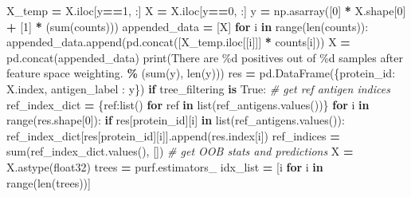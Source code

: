 \documentclass[
  11pt,
  oneside]{book}
\newenvironment{Shaded}{\begin{snugshade}}{\end{snugshade}}
\newcommand{\BuiltInTok}[1]{#1}
\newcommand{\CommentTok}[1]{\textcolor[rgb]{0.56,0.35,0.01}{\textit{#1}}}
\newcommand{\ControlFlowTok}[1]{\textcolor[rgb]{0.13,0.29,0.53}{\textbf{#1}}}
\newcommand{\DecValTok}[1]{\textcolor[rgb]{0.00,0.00,0.81}{#1}}
\newcommand{\KeywordTok}[1]{\textcolor[rgb]{0.13,0.29,0.53}{\textbf{#1}}}
\newcommand{\NormalTok}[1]{#1}
\newcommand{\OperatorTok}[1]{\textcolor[rgb]{0.81,0.36,0.00}{\textbf{#1}}}
\newcommand{\SpecialCharTok}[1]{\textcolor[rgb]{0.00,0.00,0.00}{#1}}
\newcommand{\StringTok}[1]{\textcolor[rgb]{0.31,0.60,0.02}{#1}}
\newcommand{\VariableTok}[1]{\textcolor[rgb]{0.00,0.00,0.00}{#1}}
\begin{document}
\begin{Shaded}
\begin{Highlighting}[]
\NormalTok{    X\_temp }\OperatorTok{=}\NormalTok{ X.iloc[y}\OperatorTok{==}\DecValTok{1}\NormalTok{, :]}
\NormalTok{    X }\OperatorTok{=}\NormalTok{ X.iloc[y}\OperatorTok{==}\DecValTok{0}\NormalTok{, :]}
\NormalTok{    y }\OperatorTok{=}\NormalTok{ np.asarray([}\DecValTok{0}\NormalTok{] }\OperatorTok{*}\NormalTok{ X.shape[}\DecValTok{0}\NormalTok{] }\OperatorTok{+}\NormalTok{ [}\DecValTok{1}\NormalTok{] }\OperatorTok{*}\NormalTok{ (}\BuiltInTok{sum}\NormalTok{(counts)))}
\NormalTok{    appended\_data }\OperatorTok{=}\NormalTok{ [X]}
    \ControlFlowTok{for}\NormalTok{ i }\KeywordTok{in} \BuiltInTok{range}\NormalTok{(}\BuiltInTok{len}\NormalTok{(counts)):}
\NormalTok{        appended\_data.append(pd.concat([X\_temp.iloc[[i]]] }\OperatorTok{*}\NormalTok{ counts[i]))}
\NormalTok{    X }\OperatorTok{=}\NormalTok{ pd.concat(appended\_data)}
    \BuiltInTok{print}\NormalTok{(}\StringTok{\textquotesingle{}There are }\SpecialCharTok{\%d}\StringTok{ positives out of }\SpecialCharTok{\%d}\StringTok{ samples after feature space weighting.\textquotesingle{}} \OperatorTok{\%}\NormalTok{ (}\BuiltInTok{sum}\NormalTok{(y), }\BuiltInTok{len}\NormalTok{(y)))}
\NormalTok{    res }\OperatorTok{=}\NormalTok{ pd.DataFrame(\{}\StringTok{\textquotesingle{}protein\_id\textquotesingle{}}\NormalTok{: X.index, }\StringTok{\textquotesingle{}antigen\_label\textquotesingle{}}\NormalTok{ : y\})}
    \ControlFlowTok{if}\NormalTok{ tree\_filtering }\KeywordTok{is} \VariableTok{True}\NormalTok{:}
        \CommentTok{\# get ref antigen indices}
\NormalTok{        ref\_index\_dict }\OperatorTok{=}\NormalTok{ \{ref:}\BuiltInTok{list}\NormalTok{() }\ControlFlowTok{for}\NormalTok{ ref }\KeywordTok{in} \BuiltInTok{list}\NormalTok{(ref\_antigens.values())\}}
        \ControlFlowTok{for}\NormalTok{ i }\KeywordTok{in} \BuiltInTok{range}\NormalTok{(res.shape[}\DecValTok{0}\NormalTok{]):}
            \ControlFlowTok{if}\NormalTok{ res[}\StringTok{\textquotesingle{}protein\_id\textquotesingle{}}\NormalTok{][i] }\KeywordTok{in} \BuiltInTok{list}\NormalTok{(ref\_antigens.values()):}
\NormalTok{                ref\_index\_dict[res[}\StringTok{\textquotesingle{}protein\_id\textquotesingle{}}\NormalTok{][i]].append(res.index[i])}
\NormalTok{        ref\_indices }\OperatorTok{=} \BuiltInTok{sum}\NormalTok{(ref\_index\_dict.values(), [])}
        \CommentTok{\# get OOB stats and predictions}
\NormalTok{        X }\OperatorTok{=}\NormalTok{ X.astype(}\StringTok{\textquotesingle{}float32\textquotesingle{}}\NormalTok{)}
\NormalTok{        trees }\OperatorTok{=}\NormalTok{ purf.estimators\_}
\NormalTok{        idx\_list }\OperatorTok{=}\NormalTok{ [i }\ControlFlowTok{for}\NormalTok{ i }\KeywordTok{in} \BuiltInTok{range}\NormalTok{(}\BuiltInTok{len}\NormalTok{(trees))]}

\end{Highlighting}
\end{Shaded}
\end{document}
